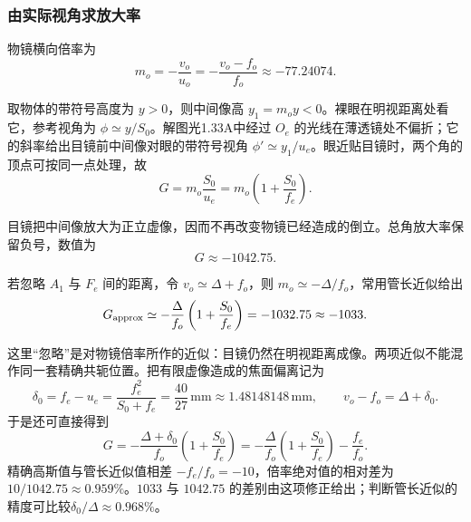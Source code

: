 \documentclass[UTF8,fontset=fandol,a4paper,11pt]{ctexart}
\begin{document}
\subsubsection*{由实际视角求放大率}
物镜横向倍率为
\[
m_o=-\frac{v_o}{u_o}
=-\frac{v_o-f_o}{f_o}\approx-77.24074.
\]

取物体的带符号高度为 $y>0$，则中间像高 $y_1=m_oy<0$。裸眼在明视距离处看它，参考视角为 $\phi\simeq y/S_0$。解图光1.33A中经过 $O_e$ 的光线在薄透镜处不偏折；它的斜率给出目镜前中间像对眼的带符号视角 $\phi'\simeq y_1/u_e$。眼近贴目镜时，两个角的顶点可按同一点处理，故
\[
G=m_o\frac{S_0}{u_e}
=m_o\left(1+\frac{S_0}{f_e}\right).
\]

目镜把中间像放大为正立虚像，因而不再改变物镜已经造成的倒立。总角放大率保留负号，数值为
\[
\boxed{G\approx-1042.75}.
\]

若忽略 $A_1$ 与 $F_e$ 间的距离，令 $v_o\simeq\Delta+f_o$，则 $m_o\simeq-\Delta/f_o$，常用管长近似给出
\[
G_{\rm approx}\simeq-\frac{\Delta}{f_o}
\left(1+\frac{S_0}{f_e}\right)
=-1032.75\approx-1033.
\]

这里“忽略”是对物镜倍率所作的近似：目镜仍然在明视距离成像。两项近似不能混作同一套精确共轭位置。把有限虚像造成的焦面偏离记为
\[
\delta_0=f_e-u_e=\frac{f_e^2}{S_0+f_e}
=\frac{40}{27}\,\mathrm{mm}\approx1.48148148\,\mathrm{mm},
\qquad v_o-f_o=\Delta+\delta_0.
\]
于是还可直接得到
\[
G=-\frac{\Delta+\delta_0}{f_o}\left(1+\frac{S_0}{f_e}\right)
=-\frac{\Delta}{f_o}\left(1+\frac{S_0}{f_e}\right)-\frac{f_e}{f_o}.
\]
精确高斯值与管长近似值相差 $-f_e/f_o=-10$，倍率绝对值的相对差为 $10/1042.75\approx0.959\%$。$1033$ 与 $1042.75$ 的差别由这项修正给出；判断管长近似的精度可比较$\delta_0/\Delta\approx0.968\%$。
\end{document}
